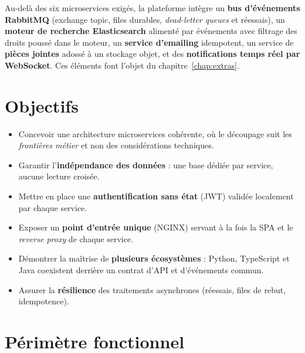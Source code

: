 \documentclass[11pt,a4paper,oneside]{report}
\begin{document}
\begin{pointcle}
Au-delà des six microservices exigés, la plateforme intègre un
\textbf{bus d'événements RabbitMQ} (exchange topic, files durables,
\emph{dead-letter queues} et réessais), un \textbf{moteur de recherche
Elasticsearch} alimenté par événements avec filtrage des droits poussé dans le
moteur, un \textbf{service d'emailing} idempotent, un service de
\textbf{pièces jointes} adossé à un stockage objet, et des
\textbf{notifications temps réel par WebSocket}. Ces éléments font l'objet du
chapitre~\ref{chap:extras}.
\end{pointcle}

\section{Objectifs}

\begin{itemize}[leftmargin=*]
  \item Concevoir une architecture microservices cohérente, où le découpage
        suit les \emph{frontières métier} et non des considérations techniques.
  \item Garantir l'\textbf{indépendance des données} : une base dédiée par
        service, aucune lecture croisée.
  \item Mettre en place une \textbf{authentification sans état} (JWT) validée
        localement par chaque service.
  \item Exposer un \textbf{point d'entrée unique} (NGINX) servant à la fois la
        SPA et le \emph{reverse proxy} de chaque service.
  \item Démontrer la maîtrise de \textbf{plusieurs écosystèmes} : Python,
        TypeScript et Java coexistent derrière un contrat d'API et
        d'événements commun.
  \item Assurer la \textbf{résilience} des traitements asynchrones (réessais,
        files de rebut, idempotence).
\end{itemize}

\section{Périmètre fonctionnel}
\end{document}

